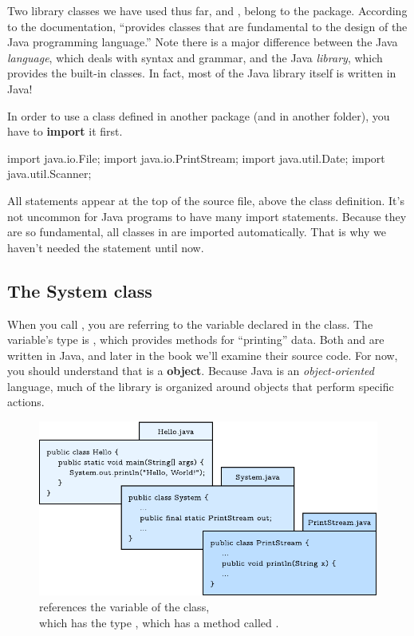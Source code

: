 Two library classes we have used thus far,  and , belong to the  package.
According to the documentation,  ``provides classes that are fundamental to the design of the Java programming language.''
Note there is a major difference between the Java {\em language}, which deals with syntax and grammar, and the Java {\em library}, which provides the built-in classes.
In fact, most of the Java library itself is written in Java!


In order to use a class defined in another package (and in another folder), you have to {\bf import} it first.

\begin{code}
import java.io.File;
import java.io.PrintStream;
import java.util.Date;
import java.util.Scanner;
\end{code}

All  statements appear at the top of the source file, above the class definition.
It's not uncommon for Java programs to have many import statements.
Because they are so fundamental, all classes in  are imported automatically.
That is why we haven't needed the  statement until now.

\subsection{The System class}
\label{sec:system}


When you call , you are referring to the  variable declared in the  class.
The  variable's type is , which provides methods for ``printing'' data.
Both  and  are written in Java, and later in the book we'll examine their source code.
For now, you should understand that  is a  {\bf object}.
Because Java is an {\em object-oriented} language, much of the library is organized around objects that perform specific actions.

\begin{figure}[!h]
\includegraphics{system.pdf}
\caption{ references the  variable of the  class,
\\ which has the type , which has a method called .}
\end{figure}

